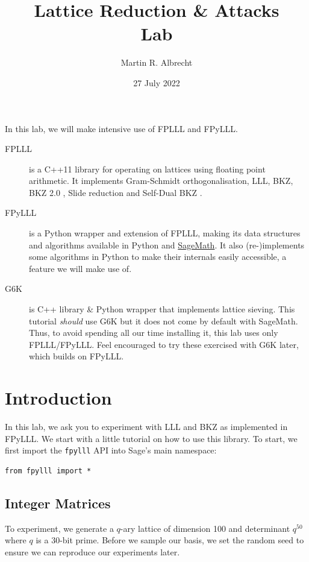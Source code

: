\documentclass[10pt,a4paper,nobib]{tufte-handout}
\author{Martin R. Albrecht}
\date{27 July 2022}
\title{Lattice Reduction \& Attacks\\\medskip
\large Lab}
\begin{document}
\maketitle
In this lab, we will make intensive use of FPLLL and FPyLLL.

\begin{description}
\item[{FPLLL}] is a C++11 library for operating on lattices using floating point arithmetic. It implements Gram-Schmidt orthogonalisation, LLL, BKZ, BKZ 2.0 , Slide reduction  and Self-Dual BKZ .

\item[{FPyLLL}] is a Python wrapper and extension of FPLLL, making its data structures and algorithms available in Python and \href{https://sagemath.org}{SageMath}. It also (re-)implements some algorithms in Python to make their internals easily accessible, a feature we will make use of.

\item[{G6K}] is C++ library \& Python wrapper that implements lattice sieving. This tutorial \emph{should} use G6K but it does not come by default with SageMath. Thus, to avoid spending all our time installing it, this lab uses only FPLLL/FPyLLL. Feel encouraged to try these exercised with G6K later, which builds on FPyLLL.
\end{description}

\section{Introduction}
\label{sec:org94c7593}
In this lab, we ask you to experiment with LLL and BKZ as implemented in FPyLLL. We start with a little tutorial on how to use this library.  To start, we first import the \texttt{fpylll} API into Sage’s main namespace:
\lstset{language=Python,label= ,caption= ,captionpos=b,numbers=none}
\begin{lstlisting}
from fpylll import *
\end{lstlisting}

\subsection{Integer Matrices}
\label{sec:org4d93d76}

To experiment, we generate a \(q\)-ary lattice of dimension 100 and determinant \(q^{50}\) where \(q\) is a 30-bit prime. Before we sample our basis, we set the random seed to ensure we can reproduce our experiments later.
\end{document}
